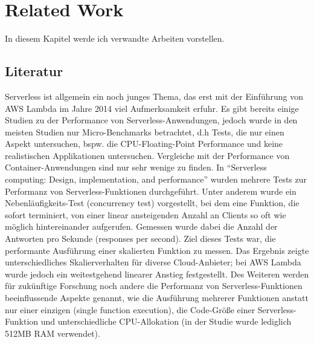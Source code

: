 \chapter{Related Work}
In diesem Kapitel werde ich verwandte Arbeiten vorstellen.

\section{Literatur}
Serverless ist allgemein ein noch junges Thema, das erst mit der Einführung von AWS Lambda im Jahre 2014 viel Aufmerksamkeit erfuhr. Es gibt bereits einige Studien zu der Performance von Serverless-Anwendungen, jedoch wurde in den meisten Studien nur Micro-Benchmarks betrachtet, d.h Tests, die nur einen Aspekt untersuchen, bspw. die CPU-Floating-Point Performance und keine realistischen Applikationen untersuchen\cite{scheuner_function-as--service_2020}. Vergleiche mit der Performance von Container-Anwendungen sind nur sehr wenige zu finden. 
In "`Serverless computing: Design, implementation, and performance"'\cite{mcgrath_serverless_2017} wurden mehrere Tests zur Performanz von Serverless-Funktionen durchgeführt. Unter anderem wurde ein Nebenläufigkeits-Test (concurrency test) vorgestellt, bei dem eine Funktion, die sofort terminiert, von einer linear ansteigenden Anzahl an Clients so oft wie möglich hintereinander aufgerufen. Gemessen wurde dabei die Anzahl der Antworten pro Sekunde (responses per second). Ziel dieses Tests war, die performante Ausführung einer skalierten Funktion zu messen. Das Ergebnis zeigte unterschiedliches Skalierverhalten für diverse Cloud-Anbieter; bei AWS Lambda wurde jedoch ein weitestgehend linearer Anstieg festgestellt. 
Des Weiteren werden für zukünftige Forschung noch andere die Performanz von Serverless-Funktionen beeinflussende Aspekte genannt, wie die Ausführung mehrerer Funktionen anstatt nur einer einzigen (single function execution), die Code-Größe einer Serverless-Funktion und unterschiedliche CPU-Allokation (in der Studie wurde lediglich 512MB RAM verwendet).

